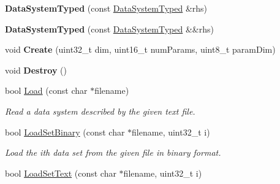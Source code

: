 \begin{DoxyCompactItemize}
\item 
\hypertarget{struct_d_r_d_s_p_1_1_data_system_typed_aeca993ba97569b6cce26575df8fd71a2}{{\bfseries Data\-System\-Typed} (const \hyperlink{struct_d_r_d_s_p_1_1_data_system_typed}{Data\-System\-Typed} \&rhs)}\label{struct_d_r_d_s_p_1_1_data_system_typed_aeca993ba97569b6cce26575df8fd71a2}

\item 
\hypertarget{struct_d_r_d_s_p_1_1_data_system_typed_a36dcf2bd60c1e177507d1215ab8baf57}{{\bfseries Data\-System\-Typed} (const \hyperlink{struct_d_r_d_s_p_1_1_data_system_typed}{Data\-System\-Typed} \&\&rhs)}\label{struct_d_r_d_s_p_1_1_data_system_typed_a36dcf2bd60c1e177507d1215ab8baf57}

\item 
\hypertarget{struct_d_r_d_s_p_1_1_data_system_typed_acc04596b19fc88c69fcf404573e6dc3a}{void {\bfseries Create} (uint32\-\_\-t dim, uint16\-\_\-t num\-Params, uint8\-\_\-t param\-Dim)}\label{struct_d_r_d_s_p_1_1_data_system_typed_acc04596b19fc88c69fcf404573e6dc3a}

\item 
\hypertarget{struct_d_r_d_s_p_1_1_data_system_typed_a0ebf2395136854994f8dbc876b27ef16}{void {\bfseries Destroy} ()}\label{struct_d_r_d_s_p_1_1_data_system_typed_a0ebf2395136854994f8dbc876b27ef16}

\item 
\hypertarget{struct_d_r_d_s_p_1_1_data_system_typed_a98e789d6a53c5d8e0b78b53421d24164}{bool \hyperlink{struct_d_r_d_s_p_1_1_data_system_typed_a98e789d6a53c5d8e0b78b53421d24164}{Load} (const char $\ast$filename)}\label{struct_d_r_d_s_p_1_1_data_system_typed_a98e789d6a53c5d8e0b78b53421d24164}

\begin{DoxyCompactList}\small\item\em Read a data system described by the given text file. \end{DoxyCompactList}\item 
\hypertarget{struct_d_r_d_s_p_1_1_data_system_typed_a771a4fb04c009cab7a220aea627b68b3}{bool \hyperlink{struct_d_r_d_s_p_1_1_data_system_typed_a771a4fb04c009cab7a220aea627b68b3}{Load\-Set\-Binary} (const char $\ast$filename, uint32\-\_\-t i)}\label{struct_d_r_d_s_p_1_1_data_system_typed_a771a4fb04c009cab7a220aea627b68b3}

\begin{DoxyCompactList}\small\item\em Load the ith data set from the given file in binary format. \end{DoxyCompactList}\item 
\hypertarget{struct_d_r_d_s_p_1_1_data_system_typed_a7a895514d71f542392931a54125bc69a}{bool \hyperlink{struct_d_r_d_s_p_1_1_data_system_typed_a7a895514d71f542392931a54125bc69a}{Load\-Set\-Text} (const char $\ast$filename, uint32\-\_\-t i)}\label{struct_d_r_d_s_p_1_1_data_system_typed_a7a895514d71f542392931a54125bc69a}


\end{DoxyCompactItemize}
